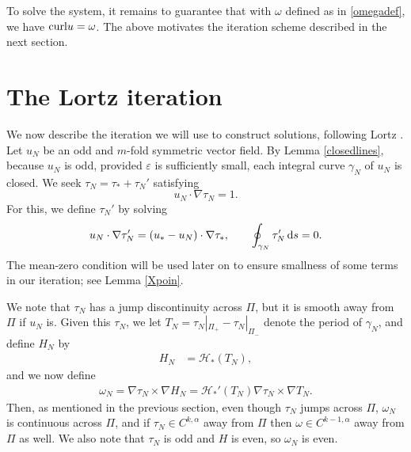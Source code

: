 \documentclass[11pt]{article}
\theoremstyle{plain}
\numberwithin{equation}{section}
\theoremstyle{remark}
\newcommand{\rmd}{{\rm d}}
\newcommand{\curl}{{\rm curl}}
\newcommand{\ve}{{\varepsilon}}
\begin{document}
To solve the system, it remains to guarantee that with $\omega$
defined as in \eqref{omegadef}, we have $\curl u = \omega$. 
The above motivates the iteration scheme described in the next section.


\section{The Lortz iteration}


We now describe the iteration we will use to construct solutions,
following Lortz \cite{L70}.
Let $u_N$ be an odd and $m$-fold symmetric vector field.
By Lemma \ref{closedlines}, because $u_N$ is odd, provided
$\ve$ is sufficiently small, each integral curve $\gamma_N$ of $u_N$ is closed.
We seek $\tau_N = \tau_* + \tau_N'$ satisfying
\begin{equation}
  \label{tauN}
  u_N\cdot \nabla \tau_N = 1.
\end{equation}
For this, we define $\tau_N'$ by solving
\begin{equation}
  \label{tauNprime}
    u_N\cdot \nabla \tau_N' = (u_* - u_N)\cdot \nabla \tau_*,\qquad
    \oint_{\gamma_N} \tau_N'\, \rmd s = 0.
\end{equation}
The mean-zero condition will be used later on to ensure smallness
of some terms in our iteration; see Lemma \ref{Xpoin}. 

We note that $\tau_N$ has a jump discontinuity across $\Pi$, but
it is smooth away from $\Pi$ if $u_N$ is.
Given this $\tau_N$, we let $T_N = \tau_N|_{\Pi_+} - \tau_N|_{\Pi_-}$ denote the period
of $\gamma_N$, and define $H_N$ by
\begin{align}
  \label{qN}
  H_N &= \mathcal{H}_*(T_N),
\end{align}
and we now define
\begin{align}
  \label{omegaN}
  \omega_N = \nabla \tau_N \times \nabla H_N = \mathcal{H}_*'(T_N) \nabla \tau_N \times \nabla T_N.
\end{align}
Then, as mentioned in the previous section, even though $\tau_N$ jumps across $\Pi$,
$\omega_N$ is continuous
across $\Pi$, and if $\tau_N \in C^{k,\alpha}$ away from $\Pi$ then $\omega \in C^{k-1,\alpha}$
away from $\Pi$ as well. We also note that $\tau_N$ is odd and $H$ is even, so $\omega_N$
is even.
\end{document}
